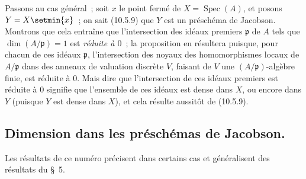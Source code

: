 Passons au cas général~; soit $x$ le point fermé de
$X=\operatorname{Spec}(A)$, et posons $Y=X\setmin\{x\}$~; on sait (10.5.9) que $Y$
est un préschéma de Jacobson. Montrons que cela entraîne que l'intersection
des idéaux premiers $\mathfrak p$ de $A$ tels que
$\dim(A/\mathfrak p)=1$ est \emph{réduite à $0$}~; la proposition en résultera
puisque, pour chacun de ces idéaux $\mathfrak p$, l'intersection des noyaux des
homomorphismes locaux de $A/\mathfrak p$ dans des anneaux de valuation
discrète $V$, faisant de $V$ une $(A/\mathfrak p)$-algèbre finie, est réduite
à $0$. Mais dire que l'intersection de ces idéaux premiers est réduite à $0$
signifie que l'ensemble de ces idéaux est dense dans $X$, ou encore dans $Y$
(puisque $Y$ est dense dans $X$), et cela résulte aussitôt de (10.5.9).

\subsection{Dimension dans les préschémas de Jacobson.}
\label{subsection:IV.10.6-fr}

Les résultats de ce numéro précisent dans certains cas et généralisent des résultats
du \S~5.

